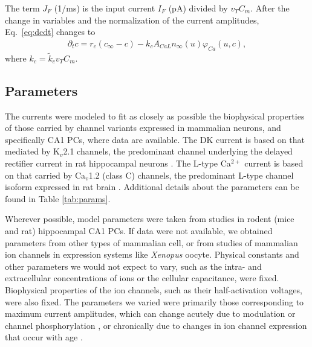 \documentclass[10pt,letterpaper]{article}
\newcommand{\Ca}{Ca$^{2+}$}
\begin{document}
The term $J_{F}$ (1/ms) is the input current $I_F$ (pA) divided by $v_T C_m$. After the change in variables and the normalization of the current amplitudes,  Eq.~\eqref{eq:dcdt} changes to 
\begin{eqnarray}
\label{eq:dcdt2}
\partial_t{c} = r_{c}({c_{\infty} - c}) - k_{c} A_{CaL}n_{\infty}(u
) \varphi_{Ca}(u,c),
\end{eqnarray}
where $k_c = \tilde{k}_c v_T C_m$.

\subsection*{Parameters}
The currents were modeled to fit as closely as possible the biophysical properties of those carried by channel variants expressed in mammalian neurons, and specifically CA1 PCs, where data are available. The DK current is based on that mediated by  K$_v$2.1 channels, the predominant channel underlying the delayed rectifier current in rat hippocampal neurons \cite{murakoshi1999identification}. The L-type {\Ca} current is based on that carried by Ca$_v$1.2 (class C) channels, the predominant L-type channel isoform expressed in rat brain \cite{hell1993identification}. Additional details about the parameters can be found in Table \ref{tab:params}.

Wherever possible, model parameters were taken from studies in rodent (mice and rat) hippocampal CA1 PCs. If data were not available, we obtained parameters from other types of mammalian cell, or from studies of mammalian ion channels in expression systems like \textit{Xenopus} oocyte. Physical constants and other parameters we would not expect to vary, such as the intra- and extracellular concentrations of ions or the cellular capacitance, were fixed. Biophysical properties of the ion channels, such as their half-activation voltages, were also fixed. The parameters we varied were primarily those corresponding to maximum current amplitudes, which can change acutely due to modulation or channel phosphorylation \cite{li1992functional,fadool1998modulation}, or chronically due to changes in ion channel expression that occur with age \cite{herman1998up,veng2002regionally}. 
\end{document}
